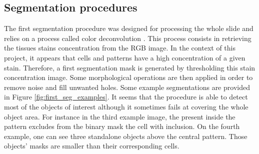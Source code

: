 \subsection{Segmentation procedures}
The first segmentation procedure was designed for processing the whole slide and relies on a process called color deconvolution \cite{ruifrok2001quantification}. This process consists in retrieving the tissues stains concentration from the RGB image. In the context of this project, it appears that cells and patterns have a high concentration of a given stain. Therefore, a first segmentation mask is generated by thresholding this stain concentration image. Some morphological operations are then applied in order to remove noise and fill unwanted holes. Some example segmentations are provided in Figure \ref{fig:first_seg_examples}. It seems that the procedure is able to detect most of the objects of interest although it sometimes fails at covering the whole object area. For instance in the third example image, the present inside the pattern excludes from the binary mask the cell with inclusion. On the fourth example, one can see three standalone objects above the central pattern. Those objects' masks are smaller than their corresponding cells.

